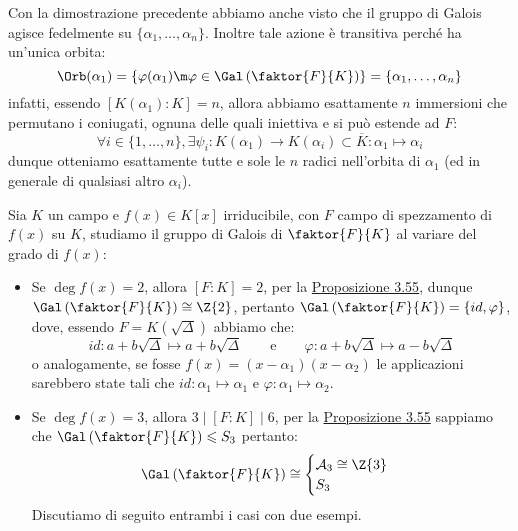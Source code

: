 \documentclass[11pt]{scrartcl}
\begin{document}
\begin{remark}
Con la dimostrazione precedente abbiamo anche visto che il gruppo di Galois agisce fedelmente su $\{\alpha_1,\ldots,\alpha_n\}$. Inoltre tale azione è transitiva perché ha un'unica orbita:
\[ \Orb(\alpha_1) = \left\{\varphi(\alpha_1) \m \varphi \in \Gal\left(\faktor{F}{K}\right)\right\} = \{\alpha_1,\ldots,\alpha_n\}
    \]
infatti, essendo $[K(\alpha_1) : K] = n$, allora abbiamo esattamente $n$ immersioni che permutano i coniugati, ognuna delle quali iniettiva e si può estende ad $F$:
\[ \forall i \in \{1,\ldots,n\},  \exists \psi_i : K(\alpha_1) \longrightarrow K(\alpha_i) \subset \overline K : \alpha_1 \longmapsto \alpha_i
    \]
dunque otteniamo esattamente tutte e sole le $n$ radici nell'orbita di $\alpha_1$ (ed in generale di qualsiasi altro $\alpha_i$).
\end{remark}

\begin{example}
    Sia $K$ un campo e $f(x) \in K[x]$ irriducibile, con $F$ campo di spezzamento di $f(x)$ su $K$, studiamo il gruppo di Galois di $\faktor{F}{K}$ al variare del grado di $f(x)$:
    \begin{itemize}
        \item Se $\deg f(x) = 2$, allora $[F : K] = 2$, per la \hyperref[3.55]{Proposizione 3.55}, dunque $\Gal\left(\faktor{F}{K}\right) \cong \Z{2}$, pertanto $\Gal\left(\faktor{F}{K}\right) = \{id,\varphi\}$, dove, essendo $F = K(\sqrt{\Delta})$ abbiamo che:
        \[ id : a+b\sqrt{\Delta} \longmapsto a+b\sqrt{\Delta} \qquad \text{e} \qquad \varphi : a+b\sqrt{\Delta} \longmapsto a-b\sqrt{\Delta}
            \]
        o analogamente, se fosse $f(x) = (x - \alpha_1)(x - \alpha_2 )$ le applicazioni sarebbero state tali che $id : \alpha_1 \longmapsto \alpha_1$ e $\varphi : \alpha_1 \longmapsto \alpha_2$.
        \item Se $\deg f(x) = 3$, allora $3 \mid [F : K] \mid 6$, per la \hyperref[3.55]{Proposizione 3.55} sappiamo che $\Gal\left(\faktor{F}{K}\right) \leqslant S_3$ pertanto:
        \[ \Gal\left(\faktor{F}{K}\right) \cong \begin{cases}
            \mathcal{A}_3 \cong \Z{3} \\
            S_3
        \end{cases}
            \]
        Discutiamo di seguito entrambi i casi con due esempi.
    \end{itemize}
\end{example}
\end{document}
